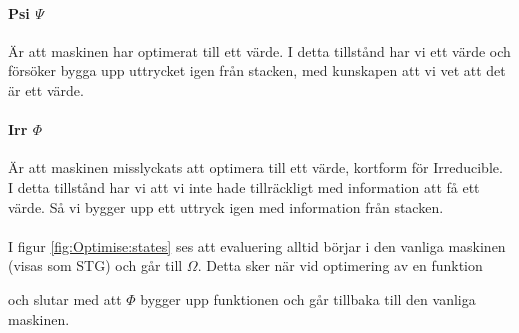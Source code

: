 \documentclass[Rapport]{subfiles}
\begin{document}
\paragraph{Psi $\Psi$} Är att maskinen har optimerat till ett värde. I detta tillstånd
har vi ett värde och försöker bygga upp uttrycket igen från stacken, med kunskapen att vi vet
att det är ett värde.

\paragraph{Irr $\Phi$} Är att maskinen misslyckats att optimera till ett värde, kortform för Irreducible.
I detta tillstånd har vi att vi inte hade tillräckligt med information att få ett
värde. Så vi bygger upp ett uttryck igen med information från stacken.

\paragraph{}
I figur \ref{fig:Optimise:states} ses att evaluering alltid börjar i den vanliga maskinen
 (visas som STG) och går till $\Omega$. Detta sker när vid optimering av en funktion
 
och slutar med att $\Phi$ bygger upp funktionen och går tillbaka till den vanliga maskinen.

\stgOptimise















\end{document}
